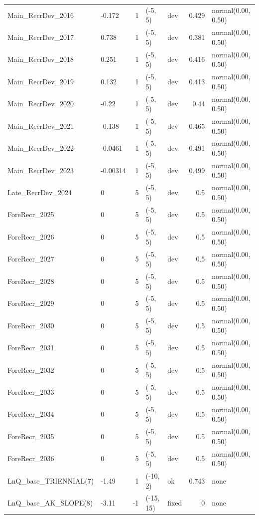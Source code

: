 \documentclass[
]{scrartcl}
\begin{document}
\begin{longtable}{llrllrl}
Main\_RecrDev\_2016 & -0.172 & 1 & (-5, 5) & dev & 0.429 & normal(0.00, 0.50) \\ 
Main\_RecrDev\_2017 & 0.738 & 1 & (-5, 5) & dev & 0.381 & normal(0.00, 0.50) \\ 
Main\_RecrDev\_2018 & 0.251 & 1 & (-5, 5) & dev & 0.416 & normal(0.00, 0.50) \\ 
Main\_RecrDev\_2019 & 0.132 & 1 & (-5, 5) & dev & 0.413 & normal(0.00, 0.50) \\ 
Main\_RecrDev\_2020 & -0.22 & 1 & (-5, 5) & dev & 0.44 & normal(0.00, 0.50) \\ 
Main\_RecrDev\_2021 & -0.138 & 1 & (-5, 5) & dev & 0.465 & normal(0.00, 0.50) \\ 
Main\_RecrDev\_2022 & -0.0461 & 1 & (-5, 5) & dev & 0.491 & normal(0.00, 0.50) \\ 
Main\_RecrDev\_2023 & -0.00314 & 1 & (-5, 5) & dev & 0.499 & normal(0.00, 0.50) \\ 
Late\_RecrDev\_2024 & 0 & 5 & (-5, 5) & dev & 0.5 & normal(0.00, 0.50) \\ 
ForeRecr\_2025 & 0 & 5 & (-5, 5) & dev & 0.5 & normal(0.00, 0.50) \\ 
ForeRecr\_2026 & 0 & 5 & (-5, 5) & dev & 0.5 & normal(0.00, 0.50) \\ 
ForeRecr\_2027 & 0 & 5 & (-5, 5) & dev & 0.5 & normal(0.00, 0.50) \\ 
ForeRecr\_2028 & 0 & 5 & (-5, 5) & dev & 0.5 & normal(0.00, 0.50) \\ 
ForeRecr\_2029 & 0 & 5 & (-5, 5) & dev & 0.5 & normal(0.00, 0.50) \\ 
ForeRecr\_2030 & 0 & 5 & (-5, 5) & dev & 0.5 & normal(0.00, 0.50) \\ 
ForeRecr\_2031 & 0 & 5 & (-5, 5) & dev & 0.5 & normal(0.00, 0.50) \\ 
ForeRecr\_2032 & 0 & 5 & (-5, 5) & dev & 0.5 & normal(0.00, 0.50) \\ 
ForeRecr\_2033 & 0 & 5 & (-5, 5) & dev & 0.5 & normal(0.00, 0.50) \\ 
ForeRecr\_2034 & 0 & 5 & (-5, 5) & dev & 0.5 & normal(0.00, 0.50) \\ 
ForeRecr\_2035 & 0 & 5 & (-5, 5) & dev & 0.5 & normal(0.00, 0.50) \\ 
ForeRecr\_2036 & 0 & 5 & (-5, 5) & dev & 0.5 & normal(0.00, 0.50) \\ 
LnQ\_base\_TRIENNIAL(7) & -1.49 & 1 & (-10, 2) & ok & 0.743 & none \\ 
LnQ\_base\_AK\_SLOPE(8) & -3.11 & -1 & (-15, 15) & fixed & 0 & none \\ 

\end{longtable}
\end{document}
